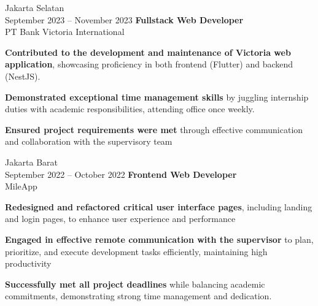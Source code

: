 \documentclass[../main.tex]{subfiles}
\begin{document}
\vspace{0.2 cm}

\begin{twocolentry}{
		Jakarta Selatan \\
		September 2023 – November 2023}
	\textbf{Fullstack Web Developer}\\
	PT Bank Victoria International
\end{twocolentry}

\vspace{0.10 cm}
\begin{onecolentry}
	\begin{highlights}
		\item \textbf{Contributed to the development and maintenance of Victoria web application}, showcasing proficiency in both frontend (Flutter) and backend (NestJS).
		\item \textbf{Demonstrated exceptional time management skills} by juggling internship duties with academic responsibilities, attending office once weekly.
		\item \textbf{Ensured project requirements were met} through effective communication and collaboration with the supervisory team
	\end{highlights}
\end{onecolentry}


\vspace{0.2 cm}

\begin{twocolentry}{
		Jakarta Barat\\
		September 2022 – October 2022}
	\textbf{Frontend Web Developer}\\
	MileApp
\end{twocolentry}

\vspace{0.10 cm}
\begin{onecolentry}
	\begin{highlights}
		\item \textbf{Redesigned and refactored critical user interface pages}, including landing and login pages, to enhance user experience and performance
		\item \textbf{Engaged in effective remote communication with the supervisor} to plan, prioritize, and execute development tasks efficiently, maintaining high productivity
		\item \textbf{Successfully met all project deadlines} while balancing academic commitments, demonstrating strong time management and dedication.
	\end{highlights}
\end{onecolentry}
\end{document}
